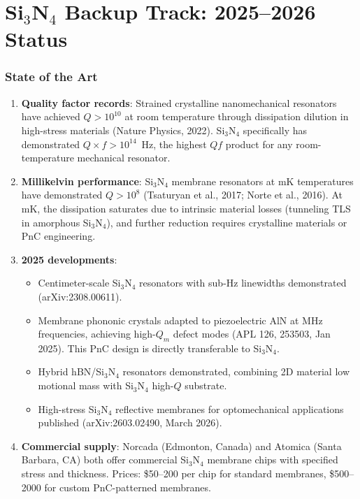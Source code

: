 \documentclass[11pt]{article}
\theoremstyle{definition}
\theoremstyle{remark}
\begin{document}
\part{Si$_3$N$_4$ Backup Track: 2025--2026 Status}
\label{part:si3n4}


\section{State of the Art}

\begin{enumerate}
\item \textbf{Quality factor records}: Strained crystalline
  nanomechanical resonators have achieved $Q > 10^{10}$ at room
  temperature through dissipation dilution in high-stress
  materials (Nature Physics, 2022). Si$_3$N$_4$ specifically
  has demonstrated $Q \times f > 10^{14}$~Hz, the highest
  $Qf$ product for any room-temperature mechanical resonator.

\item \textbf{Millikelvin performance}: Si$_3$N$_4$ membrane
  resonators at mK temperatures have demonstrated $Q > 10^8$
  (Tsaturyan et al., 2017; Norte et al., 2016). At mK, the
  dissipation saturates due to intrinsic material losses
  (tunneling TLS in amorphous Si$_3$N$_4$), and further
  reduction requires crystalline materials or PnC engineering.

\item \textbf{2025 developments}:
  \begin{itemize}[nosep]
  \item Centimeter-scale Si$_3$N$_4$ resonators with sub-Hz
    linewidths demonstrated (arXiv:2308.00611).
  \item Membrane phononic crystals adapted to piezoelectric AlN
    at MHz frequencies, achieving high-$Q_m$ defect modes (APL 126,
    253503, Jan 2025). This PnC design is directly transferable
    to Si$_3$N$_4$.
  \item Hybrid hBN/Si$_3$N$_4$ resonators demonstrated,
    combining 2D material low motional mass with Si$_3$N$_4$
    high-$Q$ substrate.
  \item High-stress Si$_3$N$_4$ reflective membranes for
    optomechanical applications published (arXiv:2603.02490,
    March 2026).
  \end{itemize}

\item \textbf{Commercial supply}: Norcada (Edmonton, Canada) and
  Atomica (Santa Barbara, CA) both offer commercial Si$_3$N$_4$
  membrane chips with specified stress and thickness. Prices:
  \$50--200 per chip for standard membranes, \$500--2000 for
  custom PnC-patterned membranes.
\end{enumerate}
\end{document}
